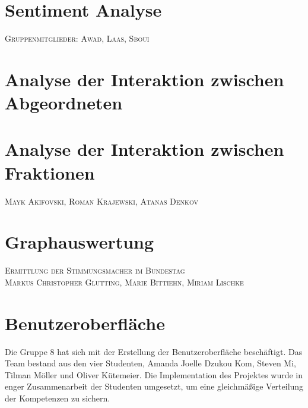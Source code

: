 \documentclass[a4paper,12pt,twoside]{book}
\begin{document}
\chapter{Sentiment Analyse}
\normalsize \textsc{Gruppenmitglieder: Awad, Laas, Sboui}






\chapter{Analyse der Interaktion zwischen Abgeordneten}


\chapter{Analyse der Interaktion zwischen Fraktionen}
\normalsize \textsc{Mayk Akifovski, Roman Krajewski, Atanas Denkov}






\chapter{Graphauswertung}
\normalsize \textsc{Ermittlung der Stimmungsmacher im Bundestag} \\
\normalsize \textsc{Markus Christopher Glutting, Marie Bittiehn, Miriam Lischke}






\chapter{Benutzeroberfläche}
Die Gruppe 8 hat sich mit der Erstellung der Benutzeroberfläche beschäftigt. Das Team bestand aus den vier Studenten, Amanda Joelle Dzukou Kom, Steven Mi, Tilman Möller und Oliver Kütemeier. Die Implementation des Projektes wurde in enger Zusammenarbeit der Studenten umgesetzt, um eine gleichmäßige Verteilung der Kompetenzen zu sichern. 







\setcounter{page}{6}

\printbibliography[title={Literaturverzeichnis}]
\newpage

\printglossaries
{}
\newpage
\end{document}
